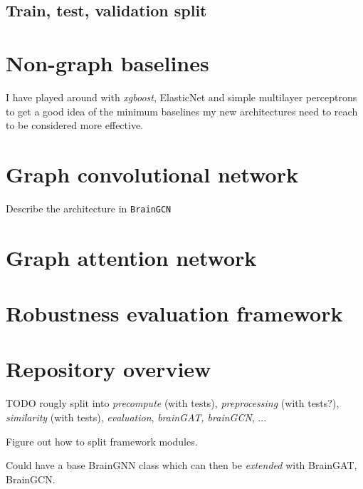 \subsection{Train, test, validation split}

\section{Non-graph baselines}
I have played around with \textit{xgboost}, ElasticNet and simple multilayer perceptrons to get a good idea of the minimum baselines my new architectures need to reach to be considered more effective.

\section{Graph convolutional network}
Describe the architecture in \texttt{BrainGCN}

\section{Graph attention network}

\section{Robustness evaluation framework}

\section{Repository overview}

TODO rougly split into \textit{precompute} (with tests), \textit{preprocessing} (with tests?), \textit{similarity} (with tests), \textit{evaluation}, \textit{brainGAT, brainGCN}, ... 


Figure out how to split framework modules.

Could have a base BrainGNN class which can then be \textit{extended} with BrainGAT, BrainGCN.
